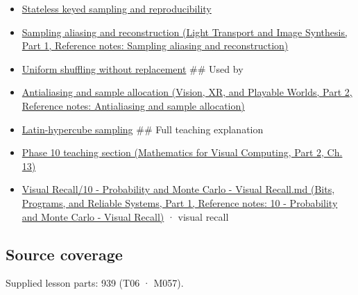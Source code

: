 \hypertarget{appendix-9f693ffd82bc-prerequisites}{}

\begin{itemize}
\item
  \hyperref[appendix-daaf25bfd3a0]{Stateless keyed sampling and reproducibility}
\item
  \href{../04-Light-Transport-and-Image-Synthesis-P01/main.pdf\#appendix-6a7869dd79a6}{Sampling aliasing and reconstruction (Light Transport and Image Synthesis, Part 1, Reference notes: Sampling aliasing and reconstruction)}
\item
  \hyperref[appendix-184fcc411663]{Uniform shuffling without replacement} \#\# Used by
\item
  \href{../07-Vision-XR-and-Playable-Worlds-P02/main.pdf\#appendix-4192b2bdd21e}{Antialiasing and sample allocation (Vision, XR, and Playable Worlds, Part 2, Reference notes: Antialiasing and sample allocation)}
\item
  \hyperref[appendix-1c5e85693a06]{Latin-hypercube sampling} \#\# Full teaching explanation
\item
  \href{../02-Mathematics-for-Visual-Computing-P02/main.pdf\#02-foundations-ii-ch029-a-computer-produces-deterministic-pseudorandom-sequences}{Phase 10 teaching section (Mathematics for Visual Computing, Part 2, Ch. 13)}
\item
  \href{../01-Bits-Programs-and-Reliable-Systems-P01/main.pdf\#appendix-cb5af353ef77}{Visual Recall/10 - Probability and Monte Carlo - Visual Recall.md (Bits, Programs, and Reliable Systems, Part 1, Reference notes: 10 - Probability and Monte Carlo - Visual Recall)} · visual recall
\end{itemize}

\subsection{Source coverage}\label{appendix-9f693ffd82bc-source-coverage}

\hypertarget{appendix-9f693ffd82bc-source-coverage}{}

Supplied lesson parts: 939 (T06 · M057).

